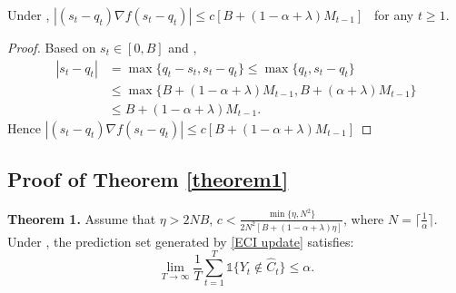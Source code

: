 \begin{proposition}
      Under , $|(s_t-q_t)\nabla f(s_t-q_t)|\leq c \left[B+(1-\alpha+\lambda)M_{t-1}\right]$ \  for any $t \geq 1$. 
\end{proposition}
\begin{proof}
Based on $s_t \in [0,B]$ and ,
\begin{align*}
    |s_t-q_t|&= \max\{q_t-s_t,s_t-q_t\} \leq \max\{q_t,s_t-q_t\}\\ &\leq \max\{B+(1-\alpha+\lambda)M_{t-1},B+(\alpha+\lambda)M_{t-1}\}
    \\ &\leq B+(1-\alpha+\lambda)M_{t-1}.
\end{align*}
Hence $|(s_t-q_t)\nabla f(s_t-q_t)|\leq c \left[B+(1-\alpha+\lambda)M_{t-1}\right]$
\end{proof}


\subsection{Proof of Theorem \ref{theorem1}}
\textbf{Theorem 1.}
    Assume that $\eta>2NB$, $c<\frac{\min\{\eta,N^2\}}{2N^2\left[B+(1-\alpha+\lambda)\eta\right]}$, where $N=\lceil \frac{1}{\alpha} \rceil$. Under , the prediction set generated by \cref{ECI update} satisfies:
    \begin{equation}
    \lim_{T \to \infty} \frac{1}{T}\sum_{t=1}^T \mathds{1}\{Y_t \notin \hat{C}_t\}\leq \alpha.
\end{equation}


